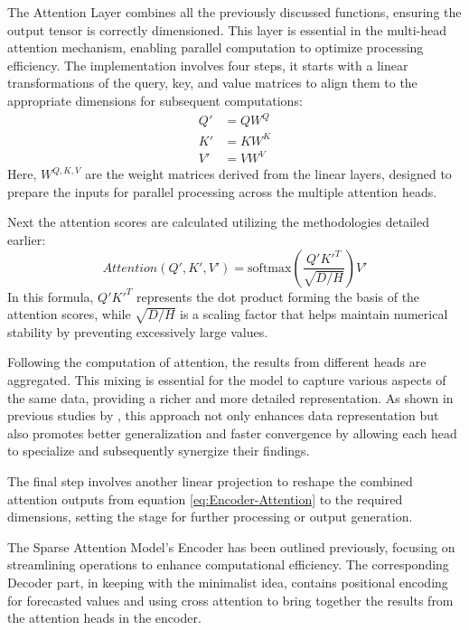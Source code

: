 \documentclass{article}
\begin{document}
The Attention Layer combines all the previously discussed functions, ensuring the output tensor is correctly dimensioned. This layer is essential in the multi-head attention mechanism, enabling parallel computation to optimize processing efficiency. The implementation involves four steps, it starts with a linear transformations of the query, key, and value matrices to align them to the appropriate dimensions for subsequent computations:
\begin{align}
    Q' &= QW^Q \\
    K' &= KW^K \\
    V' &= VW^V
\end{align}
Here, $W^{Q, K, V}$ are the weight matrices derived from the linear layers, designed to prepare the inputs for parallel processing across the multiple attention heads.

Next the attention scores are calculated utilizing the methodologies detailed earlier:
\begin{equation}\label{eq:Encoder-Attention}
    Attention(Q', K', V') = \text{softmax} \left( \frac{Q'K'^T}{\sqrt{D / H}} \right) V'
\end{equation}
In this formula, $Q'K'^T$ represents the dot product forming the basis of the attention scores, while $\sqrt{D / H}$ is a scaling factor that helps maintain numerical stability by preventing excessively large values.

Following the computation of attention, the results from different heads are aggregated. This mixing is essential for the model to capture various aspects of the same data, providing a richer and more detailed representation. As shown in previous studies by \cite{multi-head-mixing, mulit-head-mixing2}, this approach not only enhances data representation but also promotes better generalization and faster convergence by allowing each head to specialize and subsequently synergize their findings.

The final step involves another linear projection to reshape the combined attention outputs from equation \ref{eq:Encoder-Attention} to the required dimensions, setting the stage for further processing or output generation.

The Sparse Attention Model's Encoder has been outlined previously, focusing on streamlining operations to enhance computational efficiency. The corresponding Decoder part, in keeping with the minimalist idea, contains positional encoding for forecasted values and using cross attention to bring together the results from the attention heads in the encoder.
\end{document}
